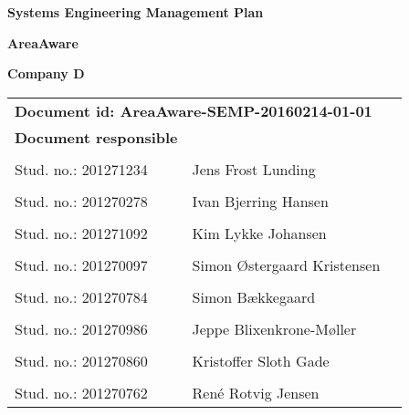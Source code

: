 
\centerline{\Huge\bfseries\color{ThemeColor} Systems Engineering Management Plan} 

\vspace{1em}
\centerline{\Large\bfseries\color{BlackColor} AreaAware} 

\vspace{5em}
\centerline{\large\bfseries\color{BlackColor}Company D} 

\begin{center}
   \begin{tabular}{ *{2}l p{6cm} }
   \multicolumn{2}{l}{\textbf{Document id: AreaAware-SEMP-20160214-01-01}} & \\
   \textbf{Document responsible} &  & \\
   & & \\
   Stud. no.: 201271234 & Jens Frost Lunding & \\\hline
   & & \\
   Stud. no.: 201270278 & Ivan Bjerring Hansen & \\\hline
   & & \\
   Stud. no.: 201271092 & Kim Lykke Johansen & \\\hline
   & & \\
   Stud. no.: 201270097 & Simon Østergaard Kristensen & \\\hline
   & & \\
   Stud. no.: 201270784  & Simon Bækkegaard & \\\hline
   & & \\
   Stud. no.:  201270986 & Jeppe Blixenkrone-Møller & \\\hline
   & & \\
   Stud. no.:  201270860 & Kristoffer Sloth Gade & \\\hline
   & & \\
   Stud. no.:  201270762 & René Rotvig Jensen & \\\hline
   \end{tabular}
\end{center}
\thispagestyle{empty} %
\restoregeometry
